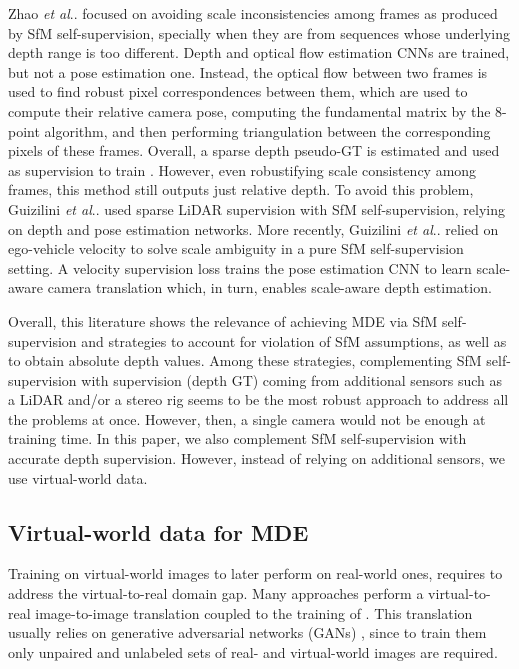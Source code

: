 \documentclass[journal]{IEEEtran}
\makeatletter
\DeclareRobustCommand\onedot{\futurelet\@let@token\@onedot}
\def\@onedot{\ifx\@let@token.\else.\null\fi\xspace}
\def\etal{\emph{et al}\onedot}
\makeatother
\begin{document}
Zhao {\etal} \cite{Zhao:2020} focused on avoiding scale inconsistencies among frames as produced by SfM self-supervision, specially when they are from sequences whose underlying depth range is too different. Depth and optical flow estimation CNNs are trained, but not a pose estimation one. Instead, the optical flow between two frames is used to find robust pixel correspondences between them, which are used to compute their relative camera pose, computing the fundamental matrix by the 8-point algorithm, and then performing triangulation between the corresponding pixels of these frames. Overall, a sparse depth pseudo-GT is estimated and used as supervision to train  . However, even robustifying scale consistency among frames, this method still outputs just relative depth. To avoid this problem, Guizilini {\etal} \cite{Guizilini:2020} used sparse LiDAR supervision with SfM self-supervision, relying on depth and pose estimation networks. More recently, Guizilini {\etal} \cite{Guizilini:20203D} relied on ego-vehicle velocity to solve scale ambiguity in a pure SfM self-supervision setting. A velocity supervision loss trains the pose estimation CNN to learn scale-aware camera translation which, in turn, enables scale-aware depth estimation. 

Overall, this literature shows the relevance of achieving MDE via SfM self-supervision and strategies to account for violation of SfM assumptions, as well as to obtain absolute depth values. Among these strategies, complementing SfM self-supervision with supervision (depth GT) coming from additional sensors such as a LiDAR and/or a stereo rig seems to be the most robust approach to address all the problems at once. However, then, a single camera would not be enough at training time. In this paper, we also complement SfM self-supervision with accurate depth supervision. However, instead of relying on additional sensors, we use virtual-world data.

\subsection{Virtual-world data for MDE}
\label{sec:rw:virtual-world-MDE}

Training  on virtual-world images to later perform on real-world ones, requires to address the virtual-to-real domain gap. Many approaches perform a virtual-to-real image-to-image translation coupled to the training of . This translation usually relies on generative adversarial networks (GANs) \cite{Goodfellow:2014, Choi:2020}, since to train them only unpaired and unlabeled sets of real- and virtual-world images are required.
\end{document}
